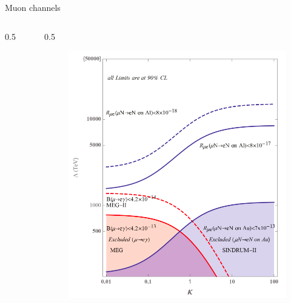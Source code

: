 \documentclass{beamer}
\begin{document}
\begin{frame}{Muon channels}
\begin{columns}
\begin{column}{0.5\framewidth}
\begin{figure}[h]
            \end{figure}  
        \end{column}
        \begin{column}{0.5\framewidth}
            \begin{figure}[h]
                \centering
                \hspace*{-6ex}
                \includegraphics[width=0.85\columnwidth]{figures/png/Screenshot_20240313_120457.png}
            \end{figure}  
        \end{column}
    \end{columns}
    
    \end{frame}
\end{document}

